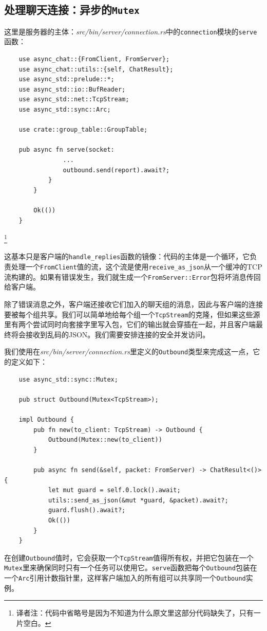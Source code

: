 \subsection{处理聊天连接：异步的\texttt{Mutex}}
这里是服务器的主体：\emph{src/bin/server/connection.rs}中的\texttt{connection}模块的\texttt{serve}函数：
\begin{verbatim}
    use async_chat::{FromClient, FromServer};
    use async_chat::utils::{self, ChatResult};
    use async_std::prelude::*;
    use async_std::io::BufReader;
    use async_std::net::TcpStream;
    use async_std::sync::Arc;

    use crate::group_table::GroupTable;

    pub async fn serve(socket: 
                ...
                outbound.send(report).await?;
            }
        }

        Ok(())
    }
\end{verbatim}
\footnote{译者注：代码中省略号是因为不知道为什么原文里这部分代码缺失了，只有一片空白。}

这基本只是客户端的\texttt{handle\_replies}函数的镜像：代码的主体是一个循环，它负责处理一个\texttt{FromClient}值的流，这个流是使用\texttt{receive\_as\_json}从一个缓冲的TCP流构建的。如果有错误发生，我们就生成一个\texttt{FromServer::Error}包将坏消息传回给客户端。

除了错误消息之外，客户端还接收它们加入的聊天组的消息，因此与客户端的连接要被每个组共享。我们可以简单地给每个组一个\texttt{TcpStream}的克隆，但如果这些源里有两个尝试同时向套接字里写入包，它们的输出就会穿插在一起，并且客户端最终将会接收到乱码的JSON。我们需要安排连接的安全并发访问。

我们使用在\emph{src/bin/server/connection.rs}里定义的\texttt{Outbound}类型来完成这一点，它的定义如下：
\begin{verbatim}
    use async_std::sync::Mutex;

    pub struct Outbound(Mutex<TcpStream>);

    impl Outbound {
        pub fn new(to_client: TcpStream) -> Outbound {
            Outbound(Mutex::new(to_client))
        }

        pub async fn send(&self, packet: FromServer) -> ChatResult<()> {
            let mut guard = self.0.lock().await;
            utils::send_as_json(&mut *guard, &packet).await?;
            guard.flush().await?;
            Ok(())
        }
    }
\end{verbatim}

在创建\texttt{Outbound}值时，它会获取一个\texttt{TcpStream}值得所有权，并把它包装在一个\texttt{Mutex}里来确保同时只有一个任务可以使用它。\texttt{serve}函数把每个\texttt{Outbound}包装在一个\texttt{Arc}引用计数指针里，这样客户端加入的所有组可以共享同一个\texttt{Outbound}实例。

